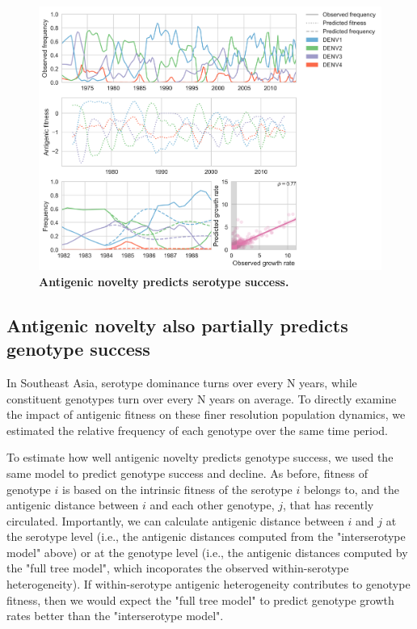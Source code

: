 \documentclass[11pt,oneside,letterpaper]{article}
\begin{document}
\begin{figure}[h]
  \begin{centering}
    \includegraphics[width=\linewidth]{../figures/png/serotype_fitness_model.png}
  	\caption{\textbf{Antigenic novelty predicts serotype success.}}
  	\label{serotype_fitness_model}
  \end{centering}
\end{figure}


\subsection{Antigenic novelty also partially predicts genotype success}

In Southeast Asia, serotype dominance turns over every N years, while constituent genotypes turn over every N years on average.
To directly examine the impact of antigenic fitness on these finer resolution population dynamics, we estimated the relative frequency of each genotype over the same time period.

To estimate how well antigenic novelty predicts genotype success, we used the same model to predict genotype success and decline.
As before, fitness of genotype $i$ is based on the intrinsic fitness of the serotype $i$ belongs to, and the antigenic distance between $i$ and each other genotype, $j$, that has recently circulated.
Importantly, we can calculate antigenic distance between $i$ and $j$ at the serotype level (i.e., the antigenic distances computed from the "interserotype model" above) or at the genotype level (i.e., the antigenic distances computed by the "full tree model", which incoporates the observed within-serotype heterogeneity).
If within-serotype antigenic heterogeneity contributes to genotype fitness, then we would expect the "full tree model" to predict genotype growth rates better than the "interserotype model".
\end{document}
